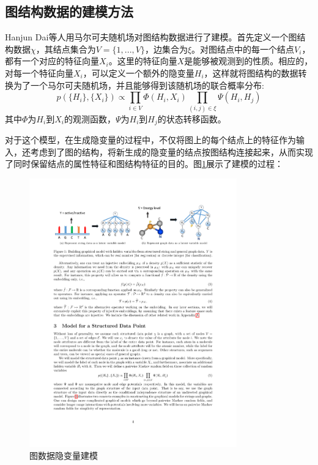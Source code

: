 \subsection{图结构数据的建模方法}
Hanjun Dai\cite{dai2016discriminative}等人用马尔可夫随机场对图结构数据进行了建模。首先定义一个图结构数据$\chi$，其结点集合为$\mathit{V}=\{1,...,V\}$，边集合为$\xi$。对图结点中的每一个结点$V_i$，都有一个对应的特征向量$X_i$。这里的特征向量$X$是能够被观测到的性质。相应的，对每一个特征向量$X_i$，可以定义一个额外的隐变量$H_i$，这样就将图结构的数据转换为了一个马尔可夫随机场，并且能够得到该随机场的联合概率分布:
\begin{equation}
p(\{H_i\}, \{X_i\}) \propto \prod_{i\in V} \Phi(H_i, X_i)\prod_{(i, j)\in \xi} \Psi(H_i, H_j)
\end{equation}
其中$\Phi$为$H_i$到$X_i$的观测函数，$\Psi$为$H_i$到$H_j$的状态转移函数。
\par 对于这个模型，在生成隐变量的过程中，不仅将图上的每个结点上的特征作为输入，还考虑到了图的结构，将新生成的隐变量的结点按图结构连接起来，从而实现了同时保留结点的属性特征和图结构特征的目的。图\ref{mod}展示了建模的过程：
\begin{figure}[htbp]
	\begin{center}
		\includegraphics[width=0.8\textwidth]{figures//1.pdf}
		\caption{图数据隐变量建模}
		\label{mod}
	\end{center}
\end{figure}
